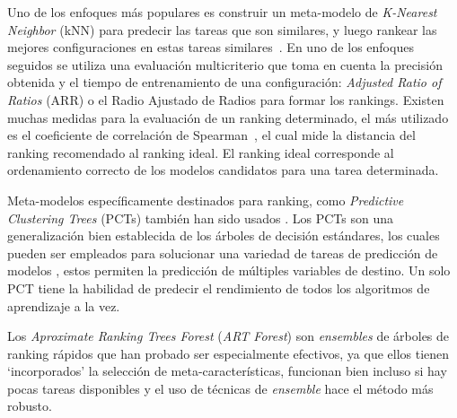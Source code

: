 Uno de los enfoques más populares es construir un meta-modelo de \textit{K-Nearest Neighbor} (kNN) para predecir las tareas que son similares, y luego rankear las mejores configuraciones en estas tareas similares~\cite{santos2004selection, bradzil2003ranking}. En uno de los enfoques seguidos se utiliza una evaluación multicriterio que toma en cuenta la precisión obtenida y el tiempo de entrenamiento de una configuración: \textit{Adjusted Ratio of Ratios} (ARR) o el Radio Ajustado de Radios para formar los rankings. Existen muchas medidas para la evaluación de un ranking determinado, el más utilizado es el coeficiente de correlación de Spearman~\cite{santos2004selection}, el cual mide la distancia del ranking recomendado al ranking ideal. El ranking ideal corresponde al ordenamiento correcto de los modelos candidatos para una tarea determinada.
 
Meta-modelos específicamente destinados para ranking, como \textit{Predictive Clustering Trees} (PCTs) también han sido usados \cite{todorovski2002ranking}. Los PCTs son una generalización bien establecida de los árboles de decisión estándares, los cuales pueden ser empleados para solucionar una variedad de tareas de predicción de modelos \cite{tomaz2020oblique}, estos permiten la predicción de múltiples variables de destino. Un solo PCT tiene la habilidad de predecir el rendimiento de todos los algoritmos de aprendizaje a la vez. %
 
Los \textit{Aproximate Ranking Trees Forest} (\textit{ART Forest}) \cite{sun2013pairwise} son \textit{ensembles} de árboles de ranking rápidos que han probado ser especialmente efectivos, ya que ellos tienen `incorporados' la selección de meta-características, funcionan bien incluso si hay pocas tareas disponibles y el uso de técnicas de \textit{ensemble} hace el método más robusto.


